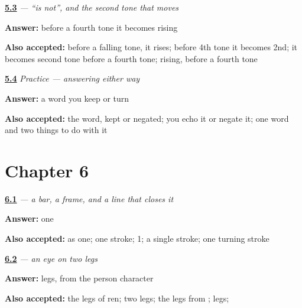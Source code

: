 \noindent\begin{minipage}[t]{\linewidth}
\raggedright
\hyperlink{review-ZH-C05-bushi-sandhi}{\textbf{5.3}} \emph{ — \textquotedblleft{}is not\textquotedblright{}, and the second tone that moves}\par
\small \textbf{Answer:} before a fourth tone it becomes rising\par
\footnotesize \textbf{Also accepted:} before a falling tone, it rises; before 4th tone it becomes 2nd; it becomes second tone before a fourth tone; rising, before a fourth tone
\end{minipage}\par\medskip

\noindent\begin{minipage}[t]{\linewidth}
\raggedright
\hyperlink{review-ZH-C05-practice-pair}{\textbf{5.4}} \emph{Practice — answering either way}\par
\small \textbf{Answer:} a word you keep or turn\par
\footnotesize \textbf{Also accepted:} the word, kept or negated; you echo it or negate it; one word and two things to do with it
\end{minipage}\par\medskip

\section*{Chapter 6}

\noindent\begin{minipage}[t]{\linewidth}
\raggedright
\hyperlink{review-ZH-W06-zai-frame}{\textbf{6.1}} \emph{ — a bar, a frame, and a line that closes it}\par
\small \textbf{Answer:} one\par
\footnotesize \textbf{Also accepted:} as one; one stroke; 1; a single stroke; one turning stroke
\end{minipage}\par\medskip

\noindent\begin{minipage}[t]{\linewidth}
\raggedright
\hyperlink{review-ZH-W06-jian-legs}{\textbf{6.2}} \emph{ — an eye on two legs}\par
\small \textbf{Answer:} legs, from the person character\par
\footnotesize \textbf{Also accepted:} the legs of ren; two legs; the legs from ; legs; 
\end{minipage}\par\medskip

